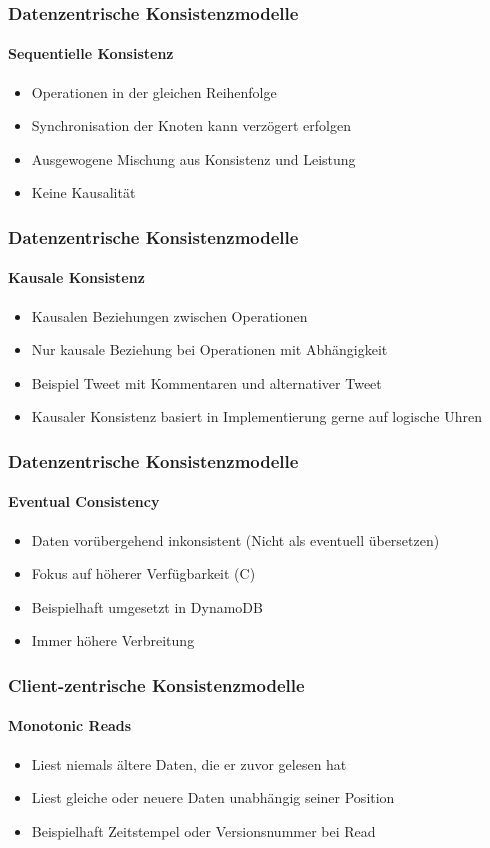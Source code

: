 \begin{frame}
  \frametitle{Datenzentrische Konsistenzmodelle}
  \framesubtitle{Sequentielle Konsistenz}
  \begin{itemize}
    \item Operationen in der gleichen Reihenfolge 
    \item Synchronisation der Knoten kann verzögert erfolgen
    \item Ausgewogene Mischung aus Konsistenz und Leistung  
    \item Keine Kausalität
  \end{itemize}
\end{frame}


\begin{frame}
  \frametitle{Datenzentrische Konsistenzmodelle}
  \framesubtitle{Kausale Konsistenz}
  \begin{itemize}
    \item Kausalen Beziehungen zwischen Operationen
    \item Nur kausale Beziehung bei Operationen mit Abhängigkeit
    \item Beispiel Tweet mit Kommentaren und alternativer Tweet 
    \item Kausaler Konsistenz basiert in Implementierung gerne auf logische Uhren
  \end{itemize}
\end{frame}

\begin{frame}
  \frametitle{Datenzentrische Konsistenzmodelle}
  \framesubtitle{Eventual Consistency}
  \begin{itemize}
    \item Daten vorübergehend inkonsistent (Nicht als eventuell übersetzen)
    \item Fokus auf höherer Verfügbarkeit (C)
    \item Beispielhaft umgesetzt in DynamoDB
    \item Immer höhere Verbreitung
  \end{itemize}
\end{frame}


\begin{frame}
  \frametitle{Client-zentrische Konsistenzmodelle}
  \framesubtitle{Monotonic Reads}
  \begin{itemize}
    \item Liest niemals ältere Daten, die er zuvor gelesen hat 
    \item Liest gleiche oder neuere Daten unabhängig seiner Position
    \item Beispielhaft Zeitstempel oder Versionsnummer bei Read
  \end{itemize}
\end{frame}


